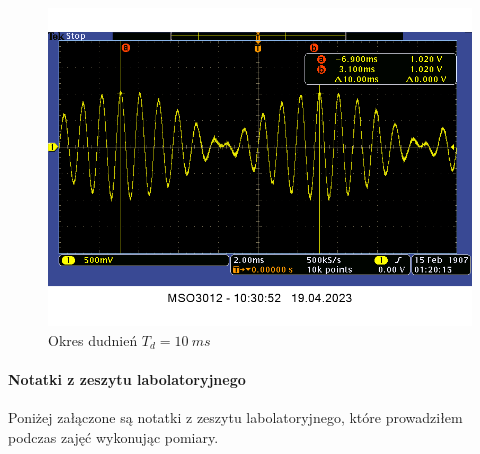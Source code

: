 \documentclass[14pt, table]{extarticle}
\begin{document}
\begin{figure}[H]
\includegraphics[scale=0.6]{A19}
\centering
\captionsetup{labelformat=empty}
\caption{Okres dudnień $T_d = 10 \ ms$}
\end{figure}

\newpage
\paragraph{Notatki z zeszytu labolatoryjnego \\}
Poniżej załączone są notatki z zeszytu labolatoryjnego, które prowadziłem podczas zajęć wykonując pomiary.
\end{document}
